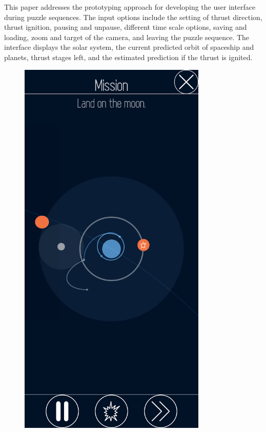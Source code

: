 \documentclass[runningheads]{llncs}
\begin{document}
This paper addresses the prototyping approach for developing the user interface during puzzle sequences.
The input options include the setting of thrust direction, thrust ignition, pausing and unpause, different 
time scale options, saving and loading, zoom and target of the camera, and leaving the puzzle sequence.
The interface displays the solar system, the current predicted orbit of spaceship and planets, thrust stages left, and the 
estimated prediction if the thrust is ignited.

\begin{figure}[!htb]
  \centering
  \begin{minipage}{.5\textwidth}
      \centering
      \includegraphics[width=0.8\textwidth]{Prototype1.png}

\end{minipage}
\end{figure}
\end{document}
